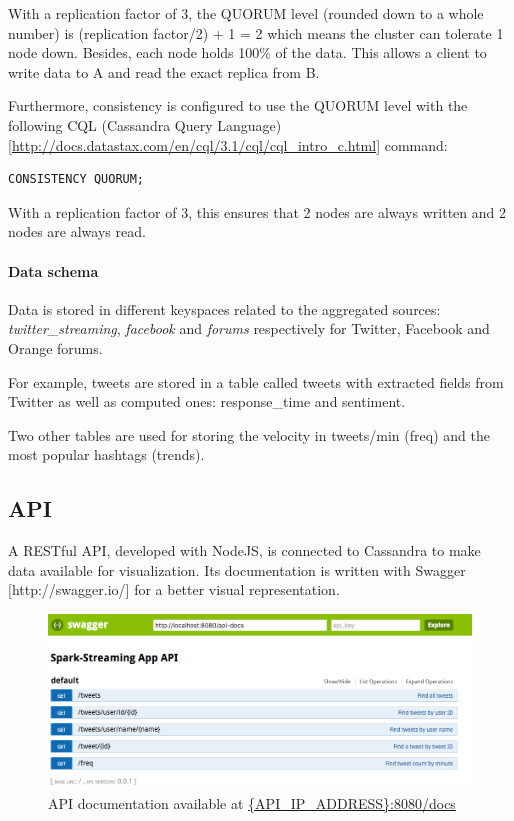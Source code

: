 \documentclass[11pt]{article}
\begin{document}
With a replication factor of 3, the QUORUM level (rounded down to a whole number) is (replication factor/2) + 1 = 2 which means the cluster can tolerate 1 node down. Besides, each node holds 100\% of the data. This allows a client to write data to A and read the exact replica from B.

Furthermore, consistency is configured to use the QUORUM level with the following \textsf{CQL} (\textsf{Cassandra} Query Language) [\url{http://docs.datastax.com/en/cql/3.1/cql/cql_intro_c.html}] command:

\begin{lstlisting}[xleftmargin=5cm]
    CONSISTENCY QUORUM;
\end{lstlisting}
With a replication factor of 3, this ensures that 2 nodes are always written and 2 nodes are always read.

\paragraph{Data schema}

Data is stored in different keyspaces related to the aggregated sources: \textit{twitter\_streaming}, \textit{facebook} and \textit{forums} respectively for \textsf{Twitter}, \textsf{Facebook} and \textsf{Orange} forums.

For example, tweets are stored in a table called tweets with extracted fields from \textsf{Twitter} as well as computed ones: response\_time and sentiment.
          
Two other tables are used for storing the velocity in tweets/min (freq) and the most popular hashtags (trends).

\subsection{API}

A RESTful API, developed with \textsf{NodeJS}, is connected to \textsf{Cassandra} to make data available for visualization. 
Its documentation is written with \textsf{Swagger} [http://swagger.io/] for a better visual representation.

\begin{figure}[h!]
    \centering
    \includegraphics[scale=0.4]{img/api-docs.png}
    \caption{API documentation available at \url{{API_IP_ADDRESS}:8080/docs}}
    \label{socket}
\end{figure}
\end{document}
